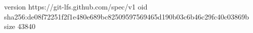 version https://git-lfs.github.com/spec/v1
oid sha256:de08f72251f2f1e480e689bc82509597569465d190b03c6b46c29fc40c03869b
size 43840
